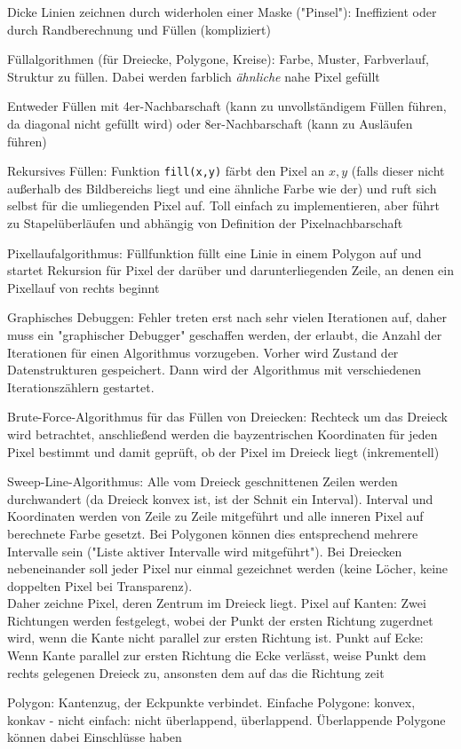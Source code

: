 \documentclass[12pt,landscape]{article}
\begin{document}
\begin{multicols}{3}
\begin{compactitem}
\item Dicke Linien zeichnen durch widerholen einer Maske ("Pinsel"): Ineffizient oder durch Randberechnung und Füllen (kompliziert)
\item Füllalgorithmen (für Dreiecke, Polygone, Kreise): Farbe, Muster, Farbverlauf, Struktur zu füllen. Dabei werden farblich \textit{ähnliche} nahe Pixel gefüllt
\item Entweder Füllen mit 4er-Nachbarschaft (kann zu unvollständigem Füllen führen, da diagonal nicht gefüllt wird) oder 8er-Nachbarschaft (kann zu Ausläufen führen)
\item Rekursives Füllen: Funktion \lstinline|fill(x,y)| färbt den Pixel an $x, y$ (falls dieser nicht außerhalb des Bildbereichs liegt und eine ähnliche Farbe wie der) und ruft sich selbst für die umliegenden Pixel auf. Toll einfach zu implementieren, aber führt zu Stapelüberläufen und abhängig von Definition der Pixelnachbarschaft
\item Pixellaufalgorithmus: Füllfunktion füllt eine Linie in einem Polygon auf und startet Rekursion für Pixel der darüber und darunterliegenden Zeile, an denen ein Pixellauf von rechts beginnt
\item Graphisches Debuggen: Fehler treten erst nach sehr vielen Iterationen auf, daher muss ein "graphischer Debugger" geschaffen werden, der erlaubt, die Anzahl der Iterationen für einen Algorithmus vorzugeben. Vorher wird Zustand der Datenstrukturen gespeichert. Dann wird der Algorithmus mit verschiedenen Iterationszählern gestartet.
\item Brute-Force-Algorithmus für das Füllen von Dreiecken: Rechteck um das Dreieck wird betrachtet, anschließend werden die bayzentrischen Koordinaten für jeden Pixel bestimmt und damit geprüft, ob der Pixel im Dreieck liegt (inkrementell)
\item Sweep-Line-Algorithmus: Alle vom Dreieck geschnittenen Zeilen werden durchwandert (da Dreieck konvex ist, ist der Schnit ein Interval). Interval und Koordinaten werden von Zeile zu Zeile mitgeführt und alle inneren Pixel auf berechnete Farbe gesetzt. Bei Polygonen können dies entsprechend mehrere Intervalle sein ("Liste aktiver Intervalle wird mitgeführt"). Bei Dreiecken nebeneinander soll jeder Pixel nur einmal gezeichnet werden (keine Löcher, keine doppelten Pixel bei Transparenz).\\ Daher zeichne Pixel, deren Zentrum im Dreieck liegt. Pixel auf Kanten: Zwei Richtungen werden festgelegt, wobei der Punkt der ersten Richtung zugerdnet wird, wenn die Kante nicht parallel zur ersten Richtung ist. Punkt auf Ecke: Wenn Kante parallel zur ersten Richtung die Ecke verlässt, weise Punkt dem rechts gelegenen Dreieck zu, ansonsten dem auf das die Richtung zeit
\item Polygon: Kantenzug, der Eckpunkte verbindet. Einfache Polygone: konvex, konkav - nicht einfach: nicht überlappend, überlappend. Überlappende Polygone können dabei Einschlüsse haben
\end{compactitem}

\end{multicols}
\end{document}
